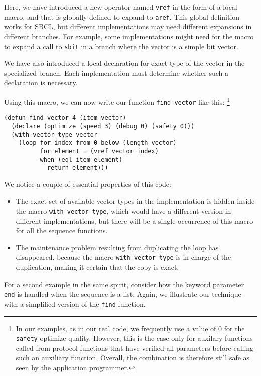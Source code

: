 Here, we have introduced a new operator named \texttt{vref} in the
form of a local macro, and that is globally defined to expand to
\texttt{aref}.  This global definition works for SBCL, but different
implementations may need different expansions in different branches.
For example, some implementations might need for the macro to expand a
call to \texttt{sbit} in a branch where the vector is a simple bit
vector.

We have also introduced a local declaration for exact type of the
vector in the specialized branch.  Each implementation must determine
whether such a declaration is necessary.

Using this macro, we can now write our function \texttt{find-vector}
like this:%
\footnote{In our examples, as in our real code, we frequently use a
  value of 0 for the \texttt{safety} optimize quality.  However, this
  is the case only for auxilary functions called from protocol
  functions that have verified all parameters before calling such an
  auxiliary function.  Overall, the combination is therefore still
  safe as seen by the application programmer.}

{\small\begin{verbatim}
(defun find-vector-4 (item vector)
  (declare (optimize (speed 3) (debug 0) (safety 0)))
  (with-vector-type vector
    (loop for index from 0 below (length vector)
          for element = (vref vector index)
          when (eql item element)
            return element)))
\end{verbatim}}

We notice a couple of essential properties of this code:

\begin{itemize}
\item The exact set of available vector types in the implementation is
  hidden inside the macro \texttt{with-vector-type}, which would have
  a different version in different \commonlisp{} implementations, but
  there will be a single occurrence of this macro for all the sequence
  functions.
\item The maintenance problem resulting from duplicating the loop has
  disappeared, because the macro \texttt{with-vector-type} is in
  charge of the duplication, making it certain that the copy is exact.
\end{itemize}

For a second example in the same spirit, consider how the keyword
parameter \texttt{end} is handled when the sequence is a list.
Again, we illustrate our technique with a simplified version of the
\texttt{find} function.

